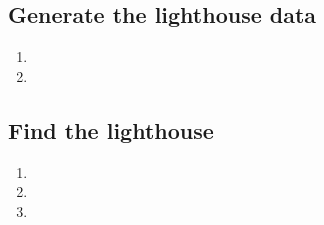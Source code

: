 \documentclass[a4paper,10pt]{article}
\numberwithin{equation}{section} %
\numberwithin{figure}{section} %
\numberwithin{table}{section} %
\theoremstyle{mytheor}
\begin{document}
\subsection{Generate the lighthouse data}
\begin{enumerate}
	\item 
	\item 
\end{enumerate}

\subsection{Find the lighthouse}
\begin{enumerate}
	\item
	\item 
	\item 
\end{enumerate}
\end{document}
